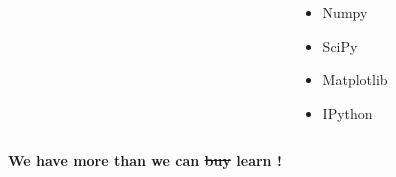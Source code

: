 \begin{frame}
\begin{columns}[t]
\begin{column}{.3\textwidth}
\begin{itemize}
      \end{itemize}
    \end{column}
    \begin{column}{.05\textwidth}
    \end{column}
    \begin{column}{.3\textwidth}
      \begin{itemize}
      \item Numpy
      \item SciPy
      \item Matplotlib
      \item IPython
      \end{itemize}
    \end{column}
    \normalsize
  \end{columns}
  \vspace{1em}
  \centerline{\textbf{We have more than we can \st{buy} learn !}} %
\end{frame}

